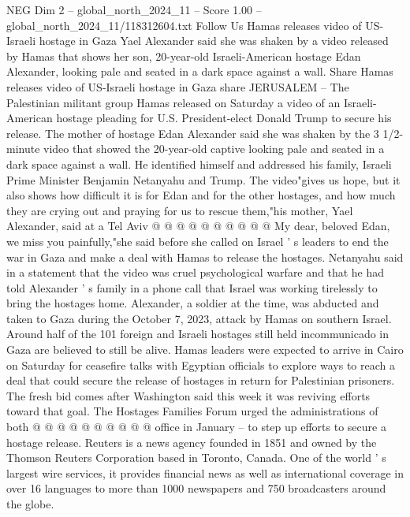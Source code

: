 \begin{textsample}{NEG Dim 2 – global\_north\_2024\_11 – Score 1.00 – global\_north\_2024\_11/118312604.txt}  \label{ex:f2_neg_092}
Follow Us Hamas releases video of US-Israeli hostage in Gaza Yael Alexander said she was shaken by a video released by Hamas that shows her son, 20-year-old Israeli-American hostage Edan Alexander, looking pale and seated in a dark space against a wall.
Share Hamas releases video of US-Israeli hostage in Gaza share JERUSALEM -- The Palestinian militant group Hamas released on Saturday a video of an Israeli-American hostage pleading for U.S.
President-elect Donald Trump to secure his release.
The mother of hostage Edan Alexander said she was shaken by the 3 1/2-minute video that showed the 20-year-old captive looking pale and seated in a dark space against a wall.
He identified himself and addressed his family, Israeli Prime Minister Benjamin Netanyahu and Trump.
The video"gives us hope, but it also shows how difficult it is for Edan and for the other hostages, and how much they are crying out and praying for us to rescue them,"his mother, Yael Alexander, said at a Tel Aviv @ @ @ @ @ @ @ @ @ @ My dear, beloved Edan, we miss you painfully,"she said before she called on Israel ' s leaders to end the war in Gaza and make a deal with Hamas to release the hostages.
Netanyahu said in a statement that the video was cruel psychological warfare and that he had told Alexander ' s family in a phone call that Israel was working tirelessly to bring the hostages home.
Alexander, a soldier at the time, was abducted and taken to Gaza during the October 7, 2023, attack by Hamas on southern Israel.
Around half of the 101 foreign and Israeli hostages still held incommunicado in Gaza are believed to still be alive.
Hamas leaders were expected to arrive in Cairo on Saturday for ceasefire talks with Egyptian officials to explore ways to reach a deal that could secure the release of hostages in return for Palestinian prisoners.
The fresh bid comes after Washington said this week it was reviving efforts toward that goal.
The Hostages Families Forum urged the administrations of both @ @ @ @ @ @ @ @ @ @ office in January -- to step up efforts to secure a hostage release.
Reuters is a news agency founded in 1851 and owned by the Thomson Reuters Corporation based in Toronto, Canada.
One of the world ' s largest wire services, it provides financial news as well as international coverage in over 16 languages to more than 1000 newspapers and 750 broadcasters around the globe.

\end{textsample}
